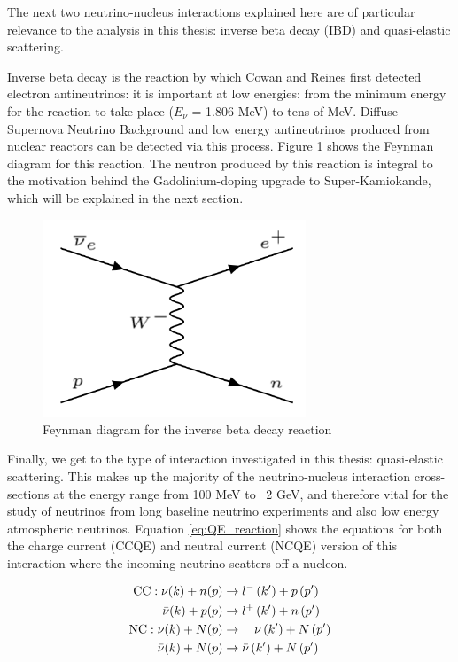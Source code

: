 The next two neutrino-nucleus interactions explained here are of particular relevance to the analysis in this thesis: inverse beta decay (IBD) and quasi-elastic scattering. 

Inverse beta decay is the reaction by which Cowan and Reines first detected electron antineutrinos: it is important at low energies: from the minimum energy for the reaction to take place ($E_{\nu}$ = 1.806 MeV) to tens of MeV. Diffuse Supernova Neutrino Background and low energy antineutrinos produced from nuclear reactors can be detected via this process. Figure \ref{fig:IBD_feynman} shows the Feynman diagram for this reaction. The neutron produced by this reaction is integral to the motivation behind the Gadolinium-doping upgrade to Super-Kamiokande, which will be explained in the next section.

\begin{figure}
    \centering
    \includegraphics[width=0.7\textwidth]{Figures/IBD_feynman.png}
    \caption{Feynman diagram for the inverse beta decay reaction}
    \label{fig:IBD_feynman}
\end{figure}

Finally, we get to the type of interaction investigated in this thesis: quasi-elastic scattering. This makes up the majority of the neutrino-nucleus interaction cross-sections at the energy range from 100 MeV to ~2 GeV, and therefore vital for the study of neutrinos from long baseline neutrino experiments and also low energy atmospheric neutrinos. Equation \ref{eq:QE_reaction} shows the equations for both the charge current (CCQE) and neutral current (NCQE) version of this interaction where the incoming neutrino scatters off a nucleon.


\begin{align} 
\mathrm{CC}: \nu(k)+n(p) & \rightarrow l^{-}\left(k^{\prime}\right)+p\left(p^{\prime}\right) \label{eq:QE_reaction}\\
\bar{\nu}(k)+p(p) & \rightarrow l^{+}\left(k^{\prime}\right)+n\left(p^{\prime}\right) \notag\\
\mathrm{NC}: \nu(k)+N(p) & \rightarrow \quad \nu\left(k^{\prime}\right)+N\left(p^{\prime}\right) \notag \\
\bar{\nu}(k)+N(p) & \rightarrow \bar{\nu}\left(k^{\prime}\right)+N\left(p^{\prime}\right) \notag 
\end{align}



